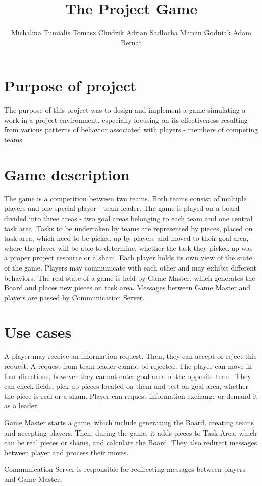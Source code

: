 \documentclass[a4paper]{article}
\title{The Project Game}
\author{Michalina Tumialis Tomasz Chudzik Adrian Sadłocha Marcin Godniak Adam Bernat}
\begin{document}
\maketitle
\newpage
\section{Purpose of project}

The purpose of this project was to design and implement a game simulating a work in a project environment, especially focusing on its effectiveness resulting from various patterns of behavior associated with players - members of competing teams.

\section{Game description}

The game is a competition between two teams. Both teams consist of multiple players and one special player - team leader.
The game is played on a board divided into three areas - two goal areas belonging to each team and one central task area.
Tasks to be undertaken by teams are represented by pieces, placed on task area, which need to be picked up by players and moved to their goal area, where the player will be able to determine, whether the task they picked up was a proper project resource or a sham. 
Each player holds its own view of the state of the game. 
Players may communicate with each other and may exhibit different behaviors. 
The real state of a game is held by Game Master, which generates the Board and places new pieces on task area. 
Messages between Game Master and players are passed by Communication Server.
\newpage
\section{Use cases}

A player may receive an information request. Then, they can accept or reject this request. A request from team leader cannot be rejected. The player can move in four directions, however they cannot enter goal area of the opposite team. They can check fields, pick up pieces located on them and test on goal area, whether the piece is real or a sham.  Player can request information exchange or demand it as a leader.

Game Master starts a game, which include generating the Board, creating teams and accepting players. Then, during the game, it adds pieces to Task Area, which can be real pieces or shams, and calculate the Board. They also redirect messages between player and process their moves.

Communication Server is responsible for redirecting messages between players and Game Master.
\newline
\end{document}
